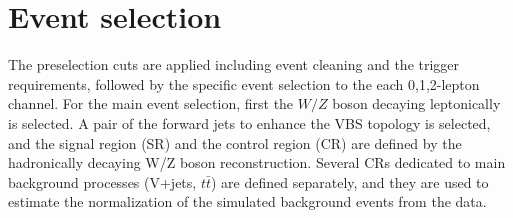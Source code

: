 \section{Event selection}
\label{sec:eventselection}
The preselection cuts are applied including event cleaning and the trigger requirements, followed by the specific event selection to the each 0,1,2-lepton channel.
For the main event selection, first the $W/Z$ boson decaying leptonically is selected. 
A pair of the forward jets to enhance the VBS topology is selected, and the signal region (SR) and the control region (CR) are defined by the hadronically decaying W/Z boson reconstruction. Several CRs dedicated to main background processes (V+jets, $t\bar{t}$) are defined separately, and they are used to estimate the normalization of the simulated background events from the data.

